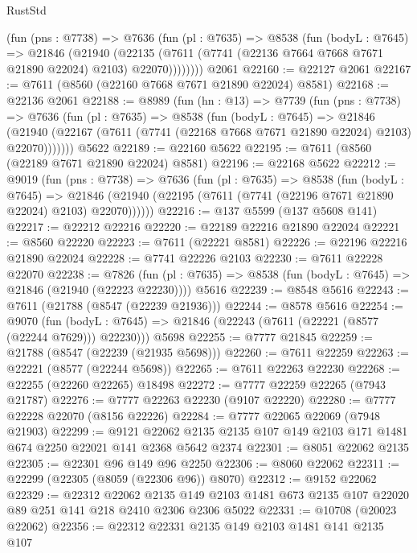 \begin{lexlean}{RustStd}
\begin{coremodule}
        (fun (pns : @7738) =>
        @7636
          (fun (pl : @7635) =>
          @8538
            (fun (bodyL : @7645) =>
            @21846
              (@21940
                (@22135 (@7611 (@7741 (@22136 @7664 @7668 @7671 @21890 @22024) @2103) @22070))))))))
    @2061
@22160 := @22127 @2061
@22167 := @7611 (@8560 (@22160 @7668 @7671 @21890 @22024) @8581)
@22168 := @22136 @2061
@22188 := @8989
    (fun (hn : @13) =>
    @7739
      (fun (pns : @7738) =>
      @7636
        (fun (pl : @7635) =>
        @8538
          (fun (bodyL : @7645) =>
          @21846
            (@21940 (@22167 (@7611 (@7741 (@22168 @7668 @7671 @21890 @22024) @2103) @22070)))))))
    @5622
@22189 := @22160 @5622
@22195 := @7611 (@8560 (@22189 @7671 @21890 @22024) @8581)
@22196 := @22168 @5622
@22212 := @9019
    (fun (pns : @7738) =>
    @7636
      (fun (pl : @7635) =>
      @8538
        (fun (bodyL : @7645) =>
        @21846 (@21940 (@22195 (@7611 (@7741 (@22196 @7671 @21890 @22024) @2103) @22070))))))
@22216 := @137 @5599 (@137 @5608 @141)
@22217 := @22212 @22216
@22220 := @22189 @22216 @21890 @22024
@22221 := @8560 @22220
@22223 := @7611 (@22221 @8581)
@22226 := @22196 @22216 @21890 @22024
@22228 := @7741 @22226 @2103
@22230 := @7611 @22228 @22070
@22238 := @7826
    (fun (pl : @7635) => @8538 (fun (bodyL : @7645) => @21846 (@21940 (@22223 @22230))))
    @5616
@22239 := @8548 @5616
@22243 := @7611 (@21788 (@8547 (@22239 @21936)))
@22244 := @8578 @5616
@22254 := @9070
    (fun (bodyL : @7645) => @21846 (@22243 (@7611 (@22221 (@8577 (@22244 @7629))) @22230)))
    @5698
@22255 := @7777 @21845
@22259 := @21788 (@8547 (@22239 (@21935 @5698)))
@22260 := @7611 @22259
@22263 := @22221 (@8577 (@22244 @5698))
@22265 := @7611 @22263 @22230
@22268 := @22255 (@22260 @22265) @18498
@22272 := @7777 @22259 @22265 (@7943 @21787)
@22276 := @7777 @22263 @22230 (@9107 @22220)
@22280 := @7777 @22228 @22070 (@8156 @22226)
@22284 := @7777 @22065 @22069 (@7948 @21903)
@22299 := @9121
    @22062
    @2135
    @2135
    @107
    @149
    @2103
    @171
    @1481
    @674
    @2250
    @22021
    @141
    @2368
    @5642
    @2374
@22301 := @8051 @22062 @2135
@22305 := @22301 @96 @149 @96 @2250
@22306 := @8060 @22062
@22311 := @22299 (@22305 (@8059 (@22306 @96)) @8070)
@22312 := @9152 @22062
@22329 := @22312
    @22062
    @2135
    @149
    @2103
    @1481
    @673
    @2135
    @107
    @22020
    @89
    @251
    @141
    @218
    @2410
    @2306
    @2306
    @5022
@22331 := @10708 (@20023 @22062)
@22356 := @22312
    @22331
    @2135
    @149
    @2103
    @1481
    @141
    @2135
    @107

\end{coremodule}
\end{lexlean}
